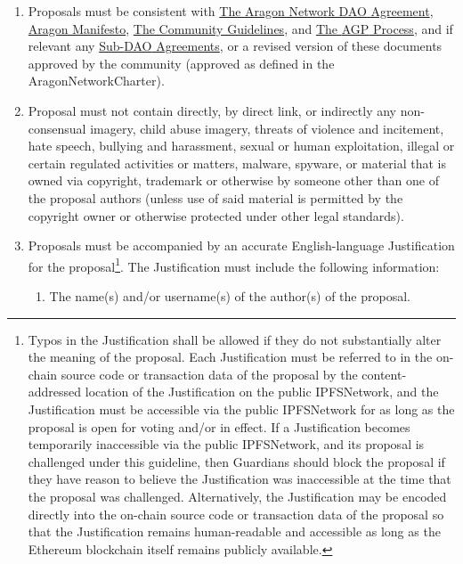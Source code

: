 \begin{enumerate}
\begin{enumerate}
		\begin{enumerate}
			\item Proposals must be consistent with  
			\hyperref[chap:ANDAOAgreement]{The Aragon Network DAO Agreement}, 
			\hyperref[chap:AragonManifesto]{Aragon Manifesto}, 
			\hyperref[chap:CommunityGuidelines]{The Community Guidelines}, and 
			\hyperref[chap:AGPProcess]{The \ac{AGP} Process}, and if relevant any 
			\hyperref[chap:SubDAOAgreements]{Sub-\ac{DAO} Agreements}, 
			or a revised version of these documents approved by the community (approved as defined in the \gls{AragonNetworkCharter}).
			\item Proposal must not contain directly, by direct link, or indirectly any non-consensual imagery, child abuse imagery, threats of violence and incitement, hate speech, bullying and harassment, sexual or human exploitation, illegal or certain regulated activities or matters, malware, spyware, or material that is owned via copyright, trademark or otherwise by someone other than one of the proposal authors (unless use of said material is permitted by the copyright owner or otherwise protected under other legal standards).
			\item Proposals must be accompanied by an accurate English-language
			Justification for the proposal\footnote[1]{
				Typos in the Justification shall be allowed if they do not substantially alter the meaning of the proposal.
				Each Justification must be referred to in the on-chain source code or transaction data of the proposal by the content-addressed location of the Justification on the public \gls{IPFSNetwork}, and the Justification must be accessible via the public \gls{IPFSNetwork} for as long as the proposal is open for voting and/or in effect.
				If a Justification becomes temporarily inaccessible via the public \gls{IPFSNetwork}, and its proposal is challenged under this guideline, then \glspl{Guardian} should block the proposal if they have reason to believe the Justification was inaccessible at the time that the proposal was challenged.
				Alternatively, the Justification may be encoded directly into the on-chain source code or transaction data of the proposal so that the Justification remains human-readable and accessible as long as the Ethereum blockchain itself remains publicly available.
			}.
			The Justification must include the following information:
			\begin{enumerate}
				\item The name(s) and/or username(s) of the author(s) of the proposal.

\end{enumerate}
\end{enumerate}
\end{enumerate}
\end{enumerate}
